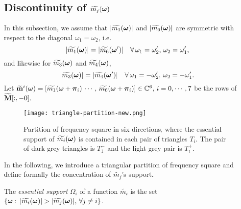 \subsection{Discontinuity of $\widetilde{m_{j}}(\boldsymbol{\omega})$}\label{subsec: discontinuity}
In this subsection, we assume that
$|\widetilde{m_{1}}(\boldsymbol{\omega})|$ and $|\widetilde{m_{6}}(\boldsymbol{\omega})|$ are symmetric with respect to the diagonal $\omega_1=\omega_2$, i.e.
$$ |\widetilde{m_1}(\boldsymbol{\omega})| = |\widetilde{m_6}(\boldsymbol{\omega}')|\quad \forall\, \omega_1=\omega_2', \,\omega_2=\omega_1',$$
and likewise for $\widetilde{m_{3}}(\boldsymbol{\omega})$ and $\widetilde{m_{4}}(\boldsymbol{\omega})$,
$$ |\widetilde{m_3}(\boldsymbol{\omega})| = |\widetilde{m_4}(\boldsymbol{\omega}')|\quad \forall\, \omega_1=-\omega_2', \,\omega_2=-\omega_1'.$$
Let $\widetilde{\mathbf{m}}^{i}(\boldsymbol{\omega}) = [\widetilde{m_1}(\boldsymbol{\omega}+\boldsymbol{\pi}_i)\, \cdots,\,\widetilde{m_6}(\boldsymbol{\omega}+\boldsymbol{\pi}_i)]\in\mathbb{C}^6,\, i = 0,\cdots,7$ be the rows of $\widetilde{\mathbf{M}}[:,-0]$. 
\begin{figure}
\centering
\texttt{[image: triangle-partition-new.png]}
\caption{Partition of frequency square in six directions, where the essential support of $\widetilde{m_{i}}(\boldsymbol{\omega})$ is contained in each pair of triangles $T_i$. The pair of dark grey triangles is $T_1^-$ and the light grey pair is $T_1^+$.}
\label{fig: partition 2}
\end{figure}
In the following, we introduce a triangular partition of frequency square and define formally the concentration of $\widetilde{m_j}$'s support.

The {\it essential support} $\Omega_i$ of a function $\widetilde{m_i}$ is the set $\{\V{\omega}:\,|\widetilde{m_i}(\V{\omega})|> |\widetilde{m_j}(\V{\omega})|,\,\forall j\neq i\}$. \vspace{.5em}

